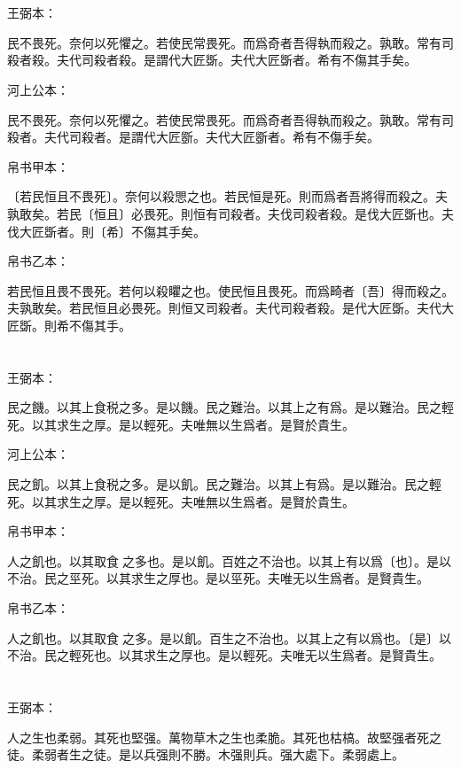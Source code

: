 \documentclass[a5paper]{ctexbook}
\begin{document}
    \chapter{}
    王弼本：

    民不畏死。奈何以死懼之。若使民常畏死。而爲奇者吾得執而殺之。孰敢。常有司殺者殺。夫代司殺者殺。是謂代大匠斲。夫代大匠斲者。希有不傷其手矣。

    河上公本：

    民不畏死。奈何以死懼之。若使民常畏死。而爲奇者吾得執而殺之。孰敢。常有司殺者。夫代司殺者。是謂代大匠斵。夫代大匠斵者。希有不傷手矣。

    帛书甲本：

    〔若民恒且不畏死〕。奈何以殺愳之也。若民恒是死。則而爲者吾將得而殺之。夫孰敢矣。若民〔恒且〕必畏死。則恒有司殺者。夫伐司殺者殺。是伐大匠斲也。夫伐大匠斲者。則〔希〕不傷其手矣。

    帛书乙本：

    若民恒且畏不畏死。若何以殺䂂之也。使民恒且畏死。而爲畸者〔吾〕得而殺之。夫孰敢矣。若民恒且必畏死。則恒又司殺者。夫代司殺者殺。是代大匠斲。夫代大匠斲。則希不傷其手。

    \chapter{}
    王弼本：

    民之饑。以其上食税之多。是以饑。民之難治。以其上之有爲。是以難治。民之輕死。以其求生之厚。是以輕死。夫唯無以生爲者。是賢於貴生。

    河上公本：

    民之飢。以其上食税之多。是以飢。民之難治。以其上有爲。是以難治。民之輕死。以其求生之厚。是以輕死。夫唯無以生爲者。是賢於貴生。

    帛书甲本：

    人之飢也。以其取食𨓚之多也。是以飢。百姓之不治也。以其上有以爲〔也〕。是以不治。民之巠死。以其求生之厚也。是以巠死。夫唯无以生爲者。是賢貴生。

    帛书乙本：

    人之飢也。以其取食𨁑之多。是以飢。百生之不治也。以其上之有以爲也。〔是〕以不治。民之輕死也。以其求生之厚也。是以輕死。夫唯无以生爲者。是賢貴生。

    \chapter{}
    王弼本：

    人之生也柔弱。其死也堅强。萬物草木之生也柔脆。其死也枯槁。故堅强者死之徒。柔弱者生之徒。是以兵强則不勝。木强則兵。强大處下。柔弱處上。
\end{document}
